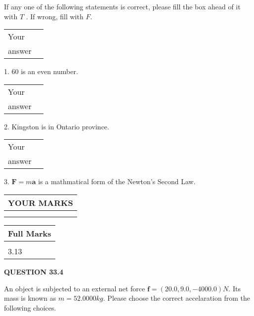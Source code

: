 \documentclass[12pt]{article}
\begin{document}
  
If any one of the following statements is correct, please fill the box ahead of it with $T$ .
If wrong, fill with $F$.
 
\noindent\begin{tabular}{|l|l|}\hline Your&\hspace{.2in} \\ answer&\hspace{.2in} \\ \hline \end{tabular}
1. $ %
60$ is an  %
even number.
 
\noindent\begin{tabular}{|l|l|}\hline Your&\hspace{.2in} \\ answer&\hspace{.2in} \\ \hline \end{tabular}
2.  %
Kingston is in  %
Ontario province.
 
\noindent\begin{tabular}{|l|l|}\hline Your&\hspace{.2in} \\ answer&\hspace{.2in} \\ \hline \end{tabular}
3.  %
$\mathbf{F}=m\mathbf{a}$ is a mathmatical form of
the Newton's Second Law.
 

 
\vspace{0.3in}
  
\vspace{0.2in}
  
\noindent\begin{tabular}{|l|}
\hline
 YOUR MARKS  \\
\hline
 \\ 
 \\ 
\hline
\end{tabular}
\hspace{0.05in} \begin{tabular}{|l|}
\hline
 Full Marks  \\
\hline
 \\ 
3.13 \\
\hline
\end{tabular}
{\textbf{\Large{QUESTION
33.4 
}}}
  
  
 
 
An object is subjected to an external net force $\mathbf{f}=
(20.0 , 9.0 , -4000.0) N$.
Its mass is known as $m= %
52.0000 kg$. Please choose the
correct accelaration from the following choices.
 
\end{document}
